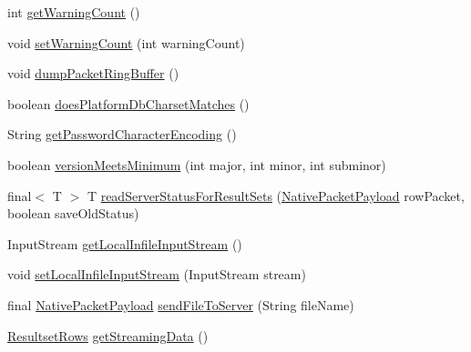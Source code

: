 \begin{DoxyCompactItemize}
int \mbox{\hyperlink{classcom_1_1mysql_1_1cj_1_1protocol_1_1a_1_1_native_protocol_a69cbb85875d11ae115f0b0364edc0261}{get\+Warning\+Count}} ()
\item 
void \mbox{\hyperlink{classcom_1_1mysql_1_1cj_1_1protocol_1_1a_1_1_native_protocol_a4889b820326c52e18ac59492675362a1}{set\+Warning\+Count}} (int warning\+Count)
\item 
void \mbox{\hyperlink{classcom_1_1mysql_1_1cj_1_1protocol_1_1a_1_1_native_protocol_aa4d8d6321c673587332f112edc89a797}{dump\+Packet\+Ring\+Buffer}} ()
\item 
boolean \mbox{\hyperlink{classcom_1_1mysql_1_1cj_1_1protocol_1_1a_1_1_native_protocol_afa8a809109f6cad91488d1f1dc4bcb4f}{does\+Platform\+Db\+Charset\+Matches}} ()
\item 
String \mbox{\hyperlink{classcom_1_1mysql_1_1cj_1_1protocol_1_1a_1_1_native_protocol_a616ff80ada9364f47f0282b2046c9b82}{get\+Password\+Character\+Encoding}} ()
\item 
boolean \mbox{\hyperlink{classcom_1_1mysql_1_1cj_1_1protocol_1_1a_1_1_native_protocol_a75978c3d6814145dfb5d0465d3185bd0}{version\+Meets\+Minimum}} (int major, int minor, int subminor)
\item 
final$<$ T $>$ T \mbox{\hyperlink{classcom_1_1mysql_1_1cj_1_1protocol_1_1a_1_1_native_protocol_a0e6a8f5b4abd6810e2e4ca5b2ebf15fd}{read\+Server\+Status\+For\+Result\+Sets}} (\mbox{\hyperlink{classcom_1_1mysql_1_1cj_1_1protocol_1_1a_1_1_native_packet_payload}{Native\+Packet\+Payload}} row\+Packet, boolean save\+Old\+Status)
\item 
Input\+Stream \mbox{\hyperlink{classcom_1_1mysql_1_1cj_1_1protocol_1_1a_1_1_native_protocol_a27e42d277d58cc8bc89f098b9ac90691}{get\+Local\+Infile\+Input\+Stream}} ()
\item 
void \mbox{\hyperlink{classcom_1_1mysql_1_1cj_1_1protocol_1_1a_1_1_native_protocol_a366f28e9d5a564e582932d16ce9d778f}{set\+Local\+Infile\+Input\+Stream}} (Input\+Stream stream)
\item 
final \mbox{\hyperlink{classcom_1_1mysql_1_1cj_1_1protocol_1_1a_1_1_native_packet_payload}{Native\+Packet\+Payload}} \mbox{\hyperlink{classcom_1_1mysql_1_1cj_1_1protocol_1_1a_1_1_native_protocol_a71b4d8891e0a316b520d07eecbba0f29}{send\+File\+To\+Server}} (String file\+Name)
\item 
\mbox{\hyperlink{interfacecom_1_1mysql_1_1cj_1_1protocol_1_1_resultset_rows}{Resultset\+Rows}} \mbox{\hyperlink{classcom_1_1mysql_1_1cj_1_1protocol_1_1a_1_1_native_protocol_ac5d86f7bf14ff86384907db34ece73fd}{get\+Streaming\+Data}} ()

\end{DoxyCompactItemize}
